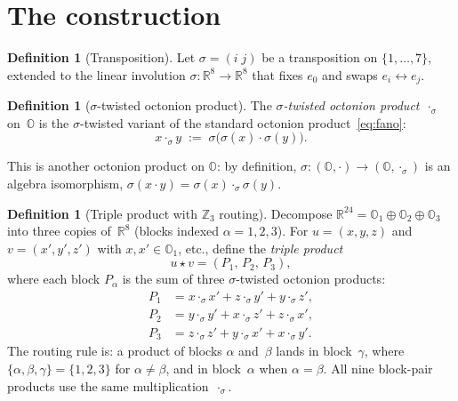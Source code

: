 \documentclass[twoside,english]{paper}
\numberwithin{equation}{section}
\numberwithin{figure}{section}
\theoremstyle{definition}
\newtheorem{definition}[theorem]{Definition}
\theoremstyle{remark}
\newcommand{\OO}{\mathbb{O}}          %
\newcommand{\RR}{\mathbb{R}}
\newcommand{\ZZ}{\mathbb{Z}}
\begin{document}
\section{The construction}\label{sec:construction}

\begin{definition}[Transposition]\label{def:twist}
Let $\sigma = (i\; j)$ be a transposition on $\{1, \ldots, 7\}$,
extended to the linear involution $\sigma \colon \RR^8 \to \RR^8$
that fixes $e_0$ and swaps $e_i \leftrightarrow e_j$.
\end{definition}

\begin{definition}[$\sigma$-twisted octonion product]\label{def:twisted-product}
The \emph{$\sigma$-twisted octonion product}~$\cdot_\sigma$ on~$\OO$
is the $\sigma$-twisted variant of the standard octonion
product~\eqref{eq:fano}:
\begin{equation}\label{eq:twist-formula}
  x \cdot_\sigma y \;:=\; \sigma\bigl(\sigma(x) \cdot \sigma(y)\bigr).
\end{equation}
\end{definition}

This is another octonion product on $\OO$: by definition,
$\sigma \colon (\OO, \cdot) \to (\OO, \cdot_\sigma)$ is an algebra
isomorphism, $\sigma(x \cdot y) = \sigma(x) \cdot_\sigma \sigma(y)$.

\begin{definition}[Triple product with $\ZZ_3$ routing]
\label{def:triple}
Decompose $\RR^{24} = \OO_1 \oplus \OO_2 \oplus \OO_3$ into three
copies of~$\RR^8$ (blocks indexed $\alpha = 1, 2, 3$).  For
$u = (x, y, z)$ and $v = (x', y', z')$ with $x, x' \in \OO_1$, etc.,
define the \emph{triple product}
\begin{equation}\label{eq:triple}
  u \star v = (P_1,\, P_2,\, P_3),
\end{equation}
where each block $P_\alpha$ is the sum of three $\sigma$-twisted
octonion products:
\begin{align}
  P_1 &= x \cdot_\sigma x' + z \cdot_\sigma y' + y \cdot_\sigma z',
  \label{eq:P1} \\
  P_2 &= y \cdot_\sigma y' + x \cdot_\sigma z' + z \cdot_\sigma x',
  \label{eq:P2} \\
  P_3 &= z \cdot_\sigma z' + y \cdot_\sigma x' + x \cdot_\sigma y'.
  \label{eq:P3}
\end{align}
The routing rule is: a product of blocks $\alpha$ and~$\beta$ lands in
block~$\gamma$, where $\{\alpha, \beta, \gamma\} = \{1,2,3\}$ for
$\alpha \ne \beta$, and in block~$\alpha$ when $\alpha = \beta$.
All nine block-pair products use the same multiplication~$\cdot_\sigma$.
\end{definition}
\end{document}
